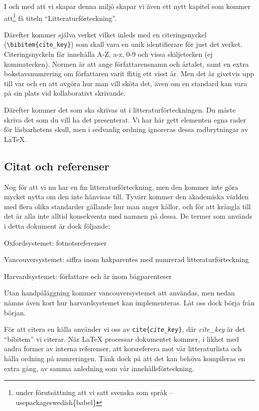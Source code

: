 I och med att vi skapar denna miljö skapar vi även ett nytt kapitel som kommer att\footnote{under förutsättning att vi satt svenska som språk -- \tb usepackage\lbrack swedish\rbrack\{babel\}} få titeln ``Litteraturförteckning''.

Därefter kommer själva verket vilket inleds med en citeringsnyckel (\verb?\bibitem{cite_key}?) som skall vara en unik identifierare för just det verket. Citeringsnyckeln får innehålla A-Z, a-z, 0-9 och vissa skiljetecken (ej kommatecken). Normen är att ange författarensnamn och årtalet, samt en extra bokstavsnumrering om författaren varit flitig ett visst år. Men det är givetvis upp till var och en att avgöra hur man vill sköta det, även om en standard kan vara på sin plats vid kollaborativt skrivande.

Därefter kommer det som ska skrivas ut i litteraturförteckningen. Du måste skriva det som du vill ha det presenterat. Vi har här gett elementen egna rader för läsbarhetens skull, men i sedvanlig ordning ignoreras dessa radbrytningar av \LaTeX.

\subsection{Citat och referenser}
Nog för att vi nu har en fin litteraturförteckning, men den kommer inte göra mycket nytta om den inte hänvisas till. Tyvärr kommer den akademiska världen med flera olika standarder gällande hur man anger källor, och för att krångla till det är alla inte alltid konsekventa med namnen på dessa. De termer som används i detta dokument är dock följande:
\itb
  \item Oxfordsystemet: fotnotsreferenser
  \item Vancouversystemet: siffra inom hakparentes med numrerad litteraturförteckning
  \item Harvardsystemet: författare och år inom bågparenteser
\ite

Utan handpåläggning kommer vancouversystemet att användas, men nedan nämns även kort hur harvardsystemet kan implementeras. Låt oss dock börja från början.

För att citera en källa använder vi oss av \texttt{\tb cite\{\emph{cite\_key}\}}, där \emph{cite\_key} är det ``bibitem'' vi citerar. När \LaTeX{} processar dokumentet kommer, i likhet med andra former av interna referenser, att korsreferera mot vår litteraturlista och hålla ordning på numreringen. Tänk dock på att det kan behöva kompileras en extra gång, av samma anledning som vår innehållsförteckning.

